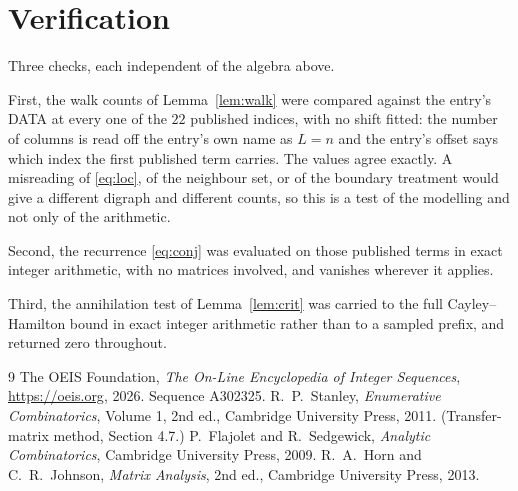 \documentclass[11pt,a4paper]{article}
\theoremstyle{plain}
\theoremstyle{definition}
\begin{document}
\section{Verification}

Three checks, each independent of the algebra above.

First, the walk counts of Lemma~\ref{lem:walk} were compared against the entry's DATA at
every one of the $22$ published indices, with no shift fitted: the number of columns is
read off the entry's own name as $L=n$ and the entry's offset says which index the first
published term carries. The values agree exactly. A misreading of \eqref{eq:loc}, of the
neighbour set, or of the boundary treatment would give a different digraph and different
counts, so this is a test of the modelling and not only of the arithmetic.

Second, the recurrence \eqref{eq:conj} was evaluated on those published terms in exact
integer arithmetic, with no matrices involved, and vanishes wherever it applies.

Third, the annihilation test of Lemma~\ref{lem:crit} was carried to the full
Cayley--Hamilton bound in exact integer arithmetic rather than to a sampled prefix, and
returned zero throughout.

\begin{thebibliography}{9}
 The OEIS Foundation, \emph{The On-Line Encyclopedia of Integer
Sequences}, \url{https://oeis.org}, 2026. Sequence A302325.
 R.~P.~Stanley, \emph{Enumerative Combinatorics}, Volume 1, 2nd ed.,
Cambridge University Press, 2011. (Transfer-matrix method, Section 4.7.)
 P.~Flajolet and R.~Sedgewick, \emph{Analytic Combinatorics}, Cambridge
University Press, 2009.
 R.~A.~Horn and C.~R.~Johnson, \emph{Matrix Analysis}, 2nd ed., Cambridge
University Press, 2013.
\end{thebibliography}
\end{document}
